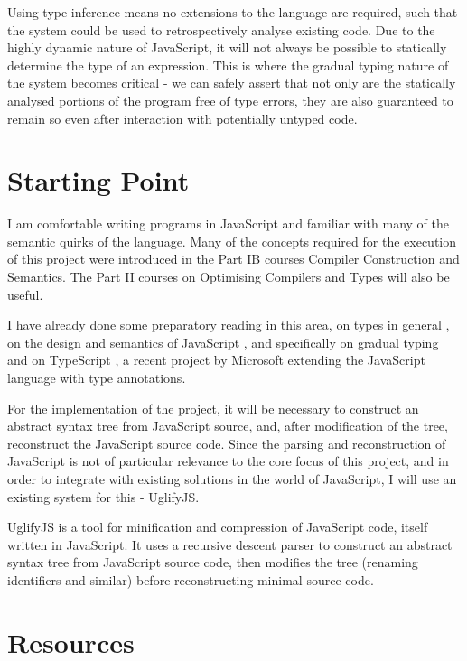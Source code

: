 \documentclass{article}
\begin{document}
		Using type inference means no extensions to the language are required, such that the system could be used to retrospectively analyse existing code. Due to the highly dynamic nature of JavaScript, it will not always be possible to statically determine the type of an expression. This is where the gradual typing nature of the system becomes critical - we can safely assert that not only are the statically analysed portions of the program free of type errors, they are also guaranteed to remain so even after interaction with potentially untyped code.

	\section{Starting Point}\label{starting-point}

		I am comfortable writing programs in JavaScript and familiar with many of the semantic quirks of the language. Many of the concepts required for the execution of this project were introduced in the Part IB courses Compiler Construction and Semantics. The Part II courses on Optimising Compilers and Types will also be useful.

		I have already done some preparatory reading in this area, on types in general \cite{types1}, on the design and semantics of JavaScript \cite{js1,js2}, and specifically on gradual typing \cite{gradual1,gradual2} and on TypeScript \cite{typescript}, a recent project by Microsoft extending the JavaScript language with type annotations.

		For the implementation of the project, it will be necessary to construct an abstract syntax tree from JavaScript source, and, after modification of the tree, reconstruct the JavaScript source code. Since the parsing and reconstruction of JavaScript is not of particular relevance to the core focus of this project, and in order to integrate with existing solutions in the world of JavaScript, I will use an existing system for this - UglifyJS.

		UglifyJS is a tool for minification and compression of JavaScript code, itself written in JavaScript. It uses a recursive descent parser to construct an abstract syntax tree from JavaScript source code, then modifies the tree (renaming identifiers and similar) before reconstructing minimal source code.

	\section{Resources}\label{resources}
\end{document}
